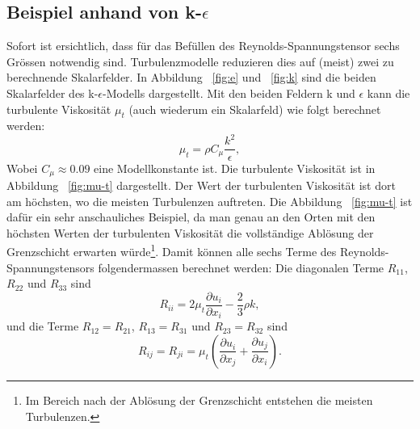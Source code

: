 \subsection{Beispiel anhand von k-$\epsilon$}
%
Sofort ist ersichtlich, dass für das Befüllen des Reynolds-Spannungstensor sechs Grössen notwendig sind.
Turbulenzmodelle reduzieren dies auf (meist) zwei zu berechnende Skalarfelder.
%
%
In Abbildung ~\ref{fig:e} und ~\ref{fig:k} sind die beiden Skalarfelder des k-$\epsilon$-Modells dargestellt.
Mit den beiden Feldern k und $\epsilon$ kann die turbulente Viskosität $\mu_t$ (auch wiederum ein Skalarfeld) wie
folgt berechnet werden:
%
\begin{equation}
    \label{eqs:Turbulent-Viscosity}
    \mu_t = \rho C_\mu \frac{k^2}{\epsilon},
\end{equation}
%
Wobei $C_\mu \approx 0.09$ eine Modellkonstante ist.
%
Die turbulente Viskosität ist in Abbildung ~\ref{fig:mu-t} dargestellt.
Der Wert der turbulenten Viskosität ist dort am höchsten, wo die meisten Turbulenzen auftreten.
Die Abbildung ~\ref{fig:mu-t} ist dafür ein sehr anschauliches Beispiel,
da man genau an den Orten mit den höchsten Werten der turbulenten Viskosität die vollständige Ablösung
der Grenzschicht erwarten würde\footnote{Im Bereich nach der Ablösung der Grenzschicht entstehen die meisten Turbulenzen.}.
%
Damit können alle sechs Terme des Reynolds-Spannungstensors folgendermassen berechnet werden:
%
Die diagonalen Terme $R_{11}$, $R_{22}$ und $R_{33}$ sind
%
\begin{equation}
    R_{ii} = 2 \mu_t \frac{\partial u_i}{\partial x_i} - \frac{2}{3}\rho k,
\end{equation}
%
und die Terme $R_{12} = R_{21}$, $R_{13} = R_{31}$ und $R_{23} = R_{32}$ sind
%
\begin{equation}
    R_{ij} = R_{ji} = \mu_t \left( \frac{\partial u_i}{\partial x_j} + \frac{\partial u_j}{\partial x_i} \right).
\end{equation}
%

